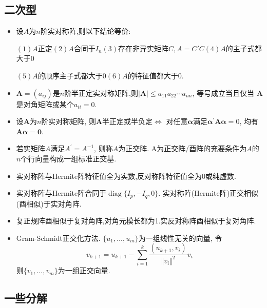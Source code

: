 \documentclass[UTF8]{ctexart}
\begin{document}
\subsection{二次型}

\begin{itemize}
\item 设$A$为$n$阶实对称阵,则以下结论等价:\par
$(1)$$A$正定\quad $(2)$$A$合同于$I_n$\quad $(3)$存在非异实矩阵$C,A=C'C$\quad $(4)$$A$的主子式都大于$0$\par 
$(5)$$A$的顺序主子式都大于$0$\quad $(6)$$A$的特征值都大于$0$.

\item $\boldsymbol{A}=\left(a_{i j}\right)$是$n$阶半正定实对称矩阵,则$|\boldsymbol{A}| \leq a_{11} a_{22} \cdots a_{n n}$,
等号成立当且仅当 $\boldsymbol{A}$ 是对角矩阵或某个$a_{ii}=0$.

\item 设$\boldsymbol{A}$为$n$阶实对称矩阵, 则$\boldsymbol{A}$半正定或半负定$\Leftrightarrow$
对任意$\boldsymbol{\alpha}$满足$\boldsymbol{\alpha}^{\prime} \boldsymbol{A} \boldsymbol{\alpha}=0$,
均有$\boldsymbol{A} \boldsymbol{\alpha}=\mathbf{0}$.

\item 若实矩阵$A$满足$A^{\prime}=A^{-1}$, 则称$A$为正交阵.
A为正交阵/酉阵的充要条件为$A$的$n$个行向量构成一组标准正交基.

\item 实对称阵与Hermite阵特征值全为实数,反对称阵特征值全为0或纯虚数.

\item 实对称阵与Hermite阵合同于$\operatorname{diag}\{I_p,-I_q,0\}$.
实对称阵(Hermite阵)正交相似(酉相似)于实对角阵.

\item 复正规阵酉相似于复对角阵,对角元模长都为1.实反对称阵酉相似于复对角阵.

\item Gram-Schmidt正交化方法.
$\{u_1,\dots,u_m\}$为一组线性无关的向量,
令$$v_{k+1}=u_{k+1}-\sum _{i=1}^k\frac{(u_{k+1},v_i)}{\Vert v_i\Vert^2}v_i$$
则$\{v_1,\dots,v_m\}$为一组正交向量.

\end{itemize}

\subsection{一些分解}
\end{document}
